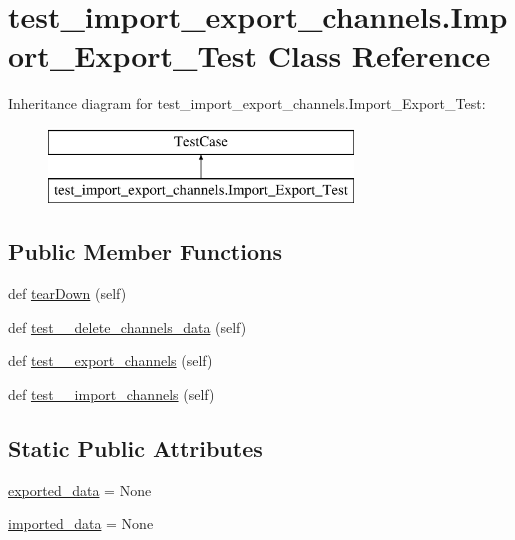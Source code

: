 \hypertarget{classtest__import__export__channels_1_1Import__Export__Test}{}\section{test\+\_\+import\+\_\+export\+\_\+channels.\+Import\+\_\+\+Export\+\_\+\+Test Class Reference}
\label{classtest__import__export__channels_1_1Import__Export__Test}
Inheritance diagram for test\+\_\+import\+\_\+export\+\_\+channels.\+Import\+\_\+\+Export\+\_\+\+Test\+:\begin{figure}[H]
\begin{center}
\leavevmode
\includegraphics[height=2.000000cm]{classtest__import__export__channels_1_1Import__Export__Test}
\end{center}
\end{figure}
\subsection*{Public Member Functions}
\begin{DoxyCompactItemize}
\item 
def \hyperlink{classtest__import__export__channels_1_1Import__Export__Test_ac8010f3afe7527c5b41c80e8ded8e111}{tear\+Down} (self)
\item 
def \hyperlink{classtest__import__export__channels_1_1Import__Export__Test_a35960ee057b5e68d9b5dd790c44844e4}{test\+\_\+\_\+delete\+\_\+channels\+\_\+data} (self)
\item 
def \hyperlink{classtest__import__export__channels_1_1Import__Export__Test_a773d4cd342672b893c6034109ac1aef1}{test\+\_\+\_\+export\+\_\+channels} (self)
\item 
def \hyperlink{classtest__import__export__channels_1_1Import__Export__Test_a2fe64af468bc4b6e58e8cf0c9faa3bfd}{test\+\_\+\_\+import\+\_\+channels} (self)
\end{DoxyCompactItemize}
\subsection*{Static Public Attributes}
\begin{DoxyCompactItemize}
\item 
\hyperlink{classtest__import__export__channels_1_1Import__Export__Test_a525fbee2a5d043600226e8384f78fde9}{exported\+\_\+data} = None
\item 
\hyperlink{classtest__import__export__channels_1_1Import__Export__Test_a78e070574094839452508d9b8f5589f3}{imported\+\_\+data} = None
\end{DoxyCompactItemize}


